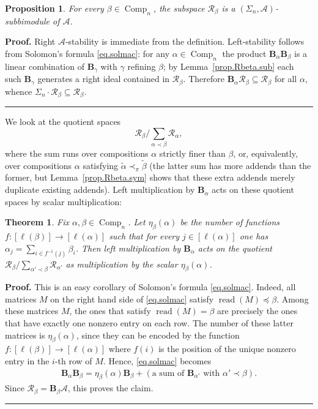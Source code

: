 \documentclass[submission]{FPSAC2026}
\newtheorem{theorem}{Theorem}
\newtheorem{proposition}{Proposition}
\newcommand{\BB}{\mathbf{B}} %
\newcommand{\Comp}{\operatorname{Comp}}
\newcommand{\tup}[1]{\left( #1 \right)}
\newcommand{\ive}[1]{\left[ #1 \right]}
\newenvironment{proof}[1][Proof]{\noindent\textbf{#1.} }{\ \rule{0.5em}{0.5em}}
\begin{document}
\begin{proposition}\label{prop.Rbeta.subbi}
For every \(\beta\in\Comp_n\), the subspace \(\mathcal R_\beta\) is a
\((\Sigma_n,\mathcal A)\)-subbimodule of \(\mathcal A\).
\end{proposition}

\begin{proof}
Right \(\mathcal A\)-stability is immediate from the definition.
Left-stability follows from Solomon's formula \eqref{eq.solmac}: for any
\(\alpha\in\Comp_n\) the product \(\mathbf{B}_\alpha\mathbf{B}_\beta\) is a
linear combination of \(\mathbf{B}_\gamma\) with \(\gamma\) refining
\(\beta\); by Lemma~\ref{prop.Rbeta.sub} each such \(\mathbf{B}_\gamma\)
generates a right ideal contained in \(\mathcal R_\beta\).  Therefore
\(\mathbf{B}_\alpha\mathcal R_\beta\subseteq\mathcal R_\beta\) for all
\(\alpha\), whence \(\Sigma_n\cdot\mathcal R_\beta\subseteq\mathcal R_\beta\).
\end{proof}
We look at the quotient spaces
\[
\mathcal R_\beta/\sum_{\alpha\prec\beta}\mathcal R_\alpha,
\]
where the sum runs over compositions \(\alpha\) strictly finer than
\(\beta\), or, equivalently, over compositions \(\alpha\) satisfying
\(\widetilde{\alpha} \prec_\pi \widetilde{\beta}\)
(the latter sum has more addends than the former, but
Lemma~\ref{prop.Rbeta.sym} shows that these extra addends
merely duplicate existing addends).
Left multiplication by \(\mathbf{B}_\alpha\) acts on these
quotient spaces by scalar multiplication:

\begin{theorem}\label{thm.Rbeta.act-on-quot}
Fix \(\alpha,\beta\in\Comp_n\). Let \(\eta_\beta(\alpha)\) be the number
of functions \(f:[\ell(\beta)]\to[\ell(\alpha)]\) such that for every
\(j\in[\ell(\alpha)]\) one has \(\alpha_j=\sum_{i\in f^{-1}(j)}\beta_i\).
Then left multiplication by \(\mathbf{B}_\alpha\) acts on the quotient
\(\mathcal R_\beta/\sum_{\alpha'\prec\beta}\mathcal R_{\alpha'}\) as
multiplication by the scalar \(\eta_\beta(\alpha)\).
\end{theorem}

\begin{proof}
This is an easy corollary of Solomon's formula \eqref{eq.solmac}.
Indeed, all matrices $M$ on the right hand side of
\eqref{eq.solmac} satisfy $\operatorname{read}(M) \preceq \beta$.
Among these matrices $M$, the ones that satisfy
$\operatorname{read}(M) = \beta$ are precisely the ones that have exactly one
nonzero entry on each row.
The number of these latter matrices is
\(\eta_\beta(\alpha)\), since they can be encoded by the
function $f : \ive{\ell(\beta)} \to \ive{\ell(\alpha)}$ where
$f\tup{i}$ is the position of the unique nonzero entry in the
$i$-th row of $M$.
Hence, \eqref{eq.solmac} becomes
\begin{align}
\BB_\alpha \BB_\beta = \eta_\beta(\alpha) \BB_\beta +
\tup{\text{a sum of } \BB_{\alpha'} \text{ with } \alpha' \prec \beta}.
\label{eq.BaBb=sum-prec}
\end{align}
Since $\mathcal{R}_\beta = \BB_\beta \mathcal{A}$, this proves the claim.
\end{proof}
\end{document}
